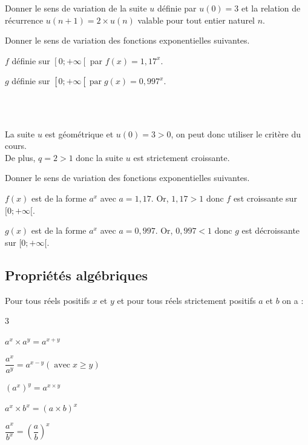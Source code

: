 \begin{exemple}
	\begin{enumEx}
		\item Donner le sens de variation de la suite $u$ définie par $u(0)=3$ et la relation de récurrence $u(n+1)=2 \times u(n)$ valable pour tout entier naturel $n$.
		\item Donner le sens de variation des fonctions exponentielles suivantes.
		\begin{enumEx}
			\item $f$ définie sur $\left[0 ;+\infty\left[\right.\right.$ par $f(x)=1,17^x$.
			\item $g$ définie sur $\left[0 ;+\infty\left[\operatorname{par} g(x)=0,997^x\right.\right.$.
		\end{enumEx}
	\end{enumEx}
	
	\ \\
	\\
	
	\begin{enumEx}
		\item La suite $u$ est géométrique et $u(0)=3>0$, on peut donc utiliser le critère du cours.\\
		De plus, $q=2>1$ donc la suite $u$ est strictement croissante.
		\item Donner le sens de variation des fonctions exponentielles suivantes.
		\begin{enumEx}
			\item $f(x)$ est de la forme $a^x$ avec $a=1,17$. Or, $1,17>1$ donc $f$ est croissante sur $[0 ;+\infty[$.
			\item $g(x)$ est de la forme $a^x$ avec $a=0,997$. Or, $0,997<1$ donc $g$ est décroissante sur $[0 ;+\infty[$.
		\end{enumEx}
	\end{enumEx}
\end{exemple}

\subsection{Propriétés algébriques}

\begin{proprietes}
	
	Pour tous réels positifs $x$ et $y$ et pour tous réels strictement positifs $a$ et $b$ on a :
	\begin{multicols}{3}
	\begin{enumDef}
		\item $a^x \times a^y=a^{x+y}$
		\item $\dfrac{a^x}{a^y}=a^{x-y}(\operatorname{avec} x \geqslant y)$
		\item $\left(a^x\right)^y=a^{x \times y}$
		\item $a^x \times b^x=(a \times b)^x$
		\item $\dfrac{a^x}{b^x}=\left(\dfrac{a}{b}\right)^x$
	\end{enumDef}
\end{multicols}
\end{proprietes}

